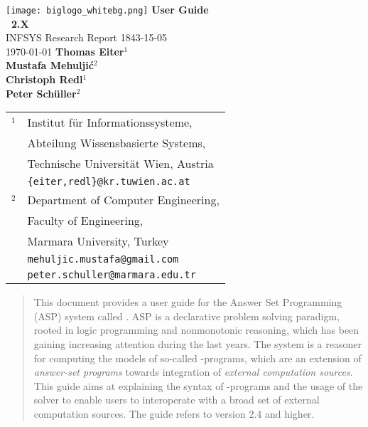 \documentclass[a4paper, titlepage]{article}
\begin{document}
\begin{titlepage}
    \centering
    \vfill
    \texttt{[image: biglogo\_whitebg.png]}
    \vskip2cm
        {\bfseries\Huge User Guide} \\[1em]
        {\bfseries\Huge \dlvhex\ 2.X} \\
        \vskip1.0cm
        {\sc\Large INFSYS Research Report 1843-15-05} \\
        \medskip
        {\Large \today}        
        \vskip2cm
        {\bfseries\Large
        Thomas Eiter$^1$\\[2mm]
        Mustafa Mehulji\'{c}$^2$ \\[2mm]
        Christoph Redl$^1$ \\[2mm]
        Peter Sch\"{u}ller$^2$ \\[2mm]
        }    
        \vspace{1cm}
        \begin{tabular}{r@{}l}
        {\Large$^1$}
          & Institut f\"ur Informationssysteme,\\
          & Abteilung Wissensbasierte Systems,\\
          & Technische Universit\"at Wien, Austria \\
          & {\tt\{eiter,redl\}@kr.tuwien.ac.at} \\[1ex]
        {\Large$^2$}
          & Department of Computer Engineering,\\
          & Faculty of Engineering, \\
          & Marmara University, Turkey \\
          & {\tt mehuljic.mustafa@gmail.com}\\
          & {\tt peter.schuller@marmara.edu.tr}
        \end{tabular}
        \vspace{4cm}
\end{titlepage}
%
%
\begin{abstract}
This document provides a user guide for the Answer Set 
Programming (ASP) system called \dlvhex{}.
ASP is a declarative 
problem solving paradigm, rooted in logic programming and 
nonmonotonic reasoning, which has been gaining increasing 
attention during the last years. The \dlvhex{} system is a 
reasoner for computing the models of so-called \hex{}-programs, which are an extension of \emph{answer-set 
programs} towards integration of \emph{external computation 
sources}. This guide aims at explaining the syntax
of \hex{}-programs and the usage of the \dlvhex{} solver
to enable users 
to interoperate with a broad set of external computation 
sources. The guide refers to version 2.4 and higher.
\end{abstract}
\end{document}
